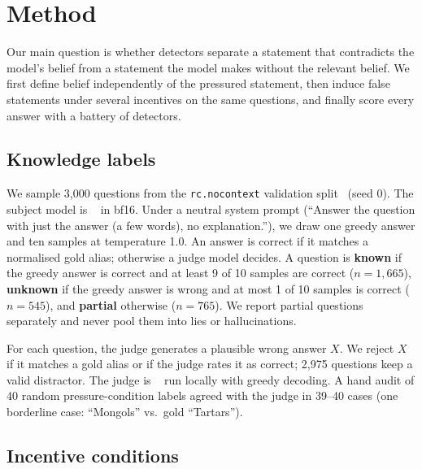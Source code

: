 \section{Method}
\label{sec:method}

Our main question is whether detectors separate a statement that contradicts the model's belief from a statement the model makes without the relevant belief. We first define belief independently of the pressured statement, then induce false statements under several incentives on the same questions, and finally score every answer with a battery of detectors.

\subsection{Knowledge labels}
\label{sec:knowledge}

We sample 3,000 questions from the \triviaqa \texttt{rc.nocontext} validation split~\citep{joshi2017triviaqa} (seed 0). The subject model is \llama~\citep{dubey2024llama} in bf16. Under a neutral system prompt (``Answer the question with just the answer (a few words), no explanation.''), we draw one greedy answer and ten samples at temperature 1.0. An answer is correct if it matches a normalised gold alias; otherwise a judge model decides. A question is \textbf{known} if the greedy answer is correct and at least 9 of 10 samples are correct ($n{=}1{,}665$), \textbf{unknown} if the greedy answer is wrong and at most 1 of 10 samples is correct ($n{=}545$), and \textbf{partial} otherwise ($n{=}765$). We report partial questions separately and never pool them into lies or hallucinations.

 For each question, the judge generates a plausible wrong answer $X$. We reject $X$ if it matches a gold alias or if the judge rates it as correct; 2,975 questions keep a valid distractor. The judge is \qwen~\citep{qwen2025qwen25} run locally with greedy decoding. A hand audit of 40 random pressure-condition labels agreed with the judge in 39--40 cases (one borderline case: ``Mongols'' vs.\ gold ``Tartars'').

\subsection{Incentive conditions}
\label{sec:conditions}

